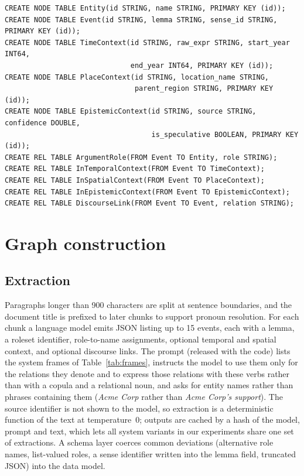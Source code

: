 \documentclass[preprint,12pt,authoryear]{elsarticle}
\begin{document}
\begin{lstlisting}[caption={Schema (K\`uzu DDL).},label={lst:ddl}]
CREATE NODE TABLE Entity(id STRING, name STRING, PRIMARY KEY (id));
CREATE NODE TABLE Event(id STRING, lemma STRING, sense_id STRING, PRIMARY KEY (id));
CREATE NODE TABLE TimeContext(id STRING, raw_expr STRING, start_year INT64,
                              end_year INT64, PRIMARY KEY (id));
CREATE NODE TABLE PlaceContext(id STRING, location_name STRING,
                               parent_region STRING, PRIMARY KEY (id));
CREATE NODE TABLE EpistemicContext(id STRING, source STRING, confidence DOUBLE,
                                   is_speculative BOOLEAN, PRIMARY KEY (id));
CREATE REL TABLE ArgumentRole(FROM Event TO Entity, role STRING);
CREATE REL TABLE InTemporalContext(FROM Event TO TimeContext);
CREATE REL TABLE InSpatialContext(FROM Event TO PlaceContext);
CREATE REL TABLE InEpistemicContext(FROM Event TO EpistemicContext);
CREATE REL TABLE DiscourseLink(FROM Event TO Event, relation STRING);
\end{lstlisting}

\section{Graph construction}
\label{sec:construction}

\subsection{Extraction}

Paragraphs longer than 900 characters are split at sentence boundaries, and the document title is prefixed to later chunks to support pronoun resolution.
For each chunk a language model emits JSON listing up to 15 events, each with a lemma, a roleset identifier, role-to-name assignments, optional temporal and spatial context, and optional discourse links.
The prompt (released with the code) lists the system frames of Table~\ref{tab:frames}, instructs the model to use them only for the relations they denote and to express those relations with these verbs rather than with a copula and a relational noun, and asks for entity names rather than phrases containing them (\textit{Acme Corp} rather than \textit{Acme Corp's support}).
The source identifier is not shown to the model, so extraction is a deterministic function of the text at temperature~0; outputs are cached by a hash of the model, prompt and text, which lets all system variants in our experiments share one set of extractions.
A schema layer coerces common deviations (alternative role names, list-valued roles, a sense identifier written into the lemma field, truncated JSON) into the data model.
\end{document}
